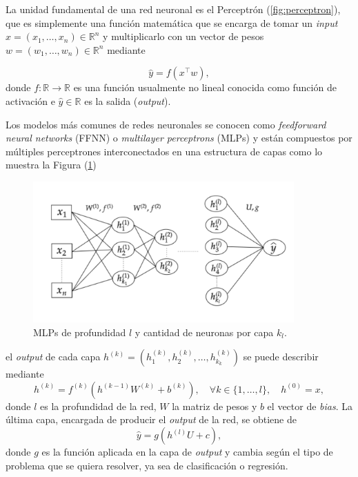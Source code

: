 \vspace{0.2cm}

La unidad fundamental de una red neuronal es el Perceptrón (\ref{fig:perceptron}), que es simplemente una función matemática que se encarga de tomar un \textit{input} $x = (x_1 , \dots , x_n) \in \mathbb{R}^n$  y multiplicarlo con un vector de pesos $w = (w_1 , \dots , w_n) \in \mathbb{R}^n$ mediante

\[
\hat{y} = f(x^{\top}w) , 
\]
donde $f: \mathbb{R} \rightarrow \mathbb{R}$ es una función usualmente no lineal conocida como función de activación e $\hat{y} \in \mathbb{R}$ es la salida (\textit{output}).  

\vspace{0.2cm}

Los modelos más comunes de redes neuronales se conocen como \textit{feedforward neural networks} (FFNN) o \textit{multilayer perceptrons} (MLPs) y están compuestos por múltiples perceptrones interconectados en una estructura de capas como lo muestra la Figura (\ref{fig:MLPs})

\begin{figure}[h]
    \centering
    \includegraphics[width=10cm]{img/tesis/MLPs.png}
    \caption{MLPs de profundidad $l$ y cantidad de neuronas por capa $k_l$.}
    \label{fig:MLPs}
\end{figure}

\noindent el \textit{output} de cada capa $h^{(k)} = (h^{(k)}_1 , h^{(k)}_2 , \dots , h^{(k)}_{k_k})$ se puede describir mediante 
\[
h^{(k)} = f^{(k)}(h^{(k-1)}W^{(k)}  + b^{(k)} ), \quad \forall k \in \{ 1 , \dots , l \} , \quad h^{(0)} = x ,   
\]
donde $l$ es la profundidad de la red, $W$ la matriz de pesos y $b$ el vector de \textit{bias}. La última capa, encargada de producir el \textit{output} de la red, se obtiene de 
\[
\hat{y} = g(h^{(l)}U + c ) , 
\]
donde $g$ es la función aplicada en la capa de \textit{output} y cambia según el tipo de problema que se quiera resolver, ya sea de clasificación o regresión. 

